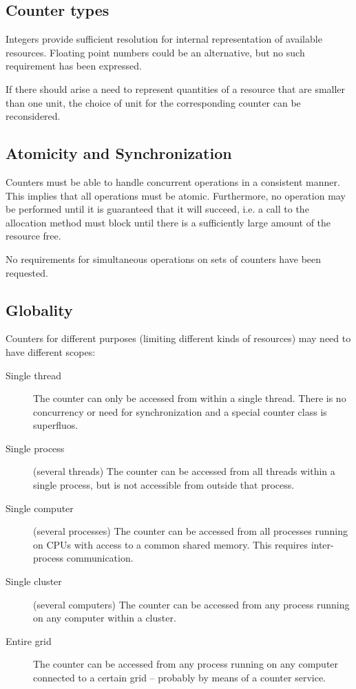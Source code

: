 \documentclass[a4paper,11pt]{article}
\begin{document}
\subsection{Counter types}

Integers provide sufficient resolution for internal representation of
available resources. Floating point numbers could be an alternative,
but no such requirement has been expressed.

If there should arise a need to represent quantities of a resource
that are smaller than one unit, the choice of unit for the
corresponding counter can be reconsidered.

\subsection{Atomicity and Synchronization}

Counters must be able to handle concurrent operations in a consistent
manner. This implies that all operations must be atomic. Furthermore,
no operation may be performed until it is guaranteed that it will
succeed, i.e. a call to the allocation method must block until there
is a sufficiently large amount of the resource free.

No requirements for simultaneous operations on sets of counters have
been requested.

\subsection{Globality}
\label{globality}

Counters for different purposes (limiting different kinds of
resources) may need to have different scopes:

\begin{description}
\item[Single thread] The counter can only be accessed from within a
single thread. There is no concurrency or need for synchronization and
a special counter class is superfluos.
\item[Single process] (several threads) The counter can be accessed
from all threads within a single process, but is not accessible from
outside that process.
\item[Single computer] (several processes) The counter can be accessed
from all processes running on CPUs with access to a common shared
memory. This requires inter-process communication.
\item[Single cluster] (several computers) The counter can be accessed
from any process running on any computer within a cluster.
\item[Entire grid] The counter can be accessed from any process
running on any computer connected to a certain grid -- probably by
means of a counter service.
\end{description}
\end{document}
